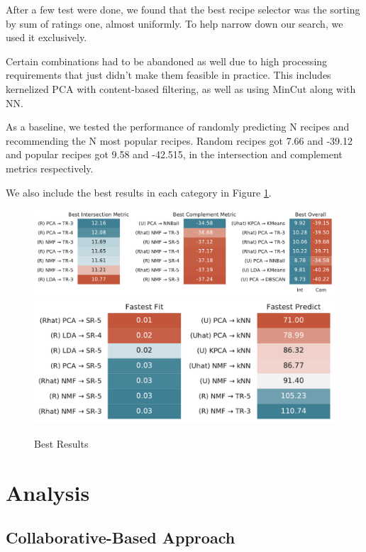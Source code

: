 \documentclass[11pt]{article}
\begin{document}
After a few test were done, we found that the best recipe selector was the sorting by sum of ratings one, almost uniformly. To help narrow down our search, we used it exclusively. 

Certain combinations had to be abandoned as well due to high processing requirements that just didn't make them feasible in practice. This includes kernelized PCA with content-based filtering, as well as using MinCut along with NN. 

As a baseline, we tested the performance of randomly predicting N recipes and recommending the N most popular recipes. Random recipes got 7.66 and -39.12 and popular recipes got 9.58 and -42.515, in the intersection and complement metrics respectively.


We also include the best results in each category in Figure \ref{fig:best}.
\begin{figure}[t]
\centering
\includegraphics[width=1\textwidth]{figs/best_metric.pdf}
\includegraphics[width=1\textwidth]{figs/best_time.pdf}
\caption{Best Results}
\label{fig:best}
\end{figure}


\section{Analysis}

\subsection{Collaborative-Based Approach}
\end{document}
